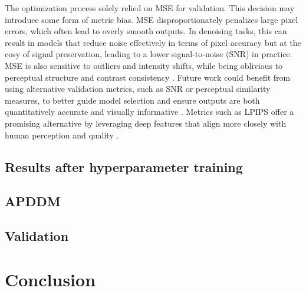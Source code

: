 \documentclass[twocolumn]{article}
\begin{document}
The optimization process solely relied on MSE for validation. This decision may introduce some form of metric bias. 
MSE disproportionately penalizes large pixel errors, which often lead to overly smooth outputs. 
In denoising tasks, this can result in models that reduce noise effectively in terms of pixel accuracy but at the cosy of signal preservation, leading to a lower signal-to-noise (SNR) in practice. 
MSE is also sensitive to outliers and intensity shifts, while being oblivious to perceptual structure and contrast consistency \cite{1284395}. 
Future work could benefit from using alternative validation metrics, such as SNR or perceptual similarity measures, to better guide model selection and ensure outputs are both quantitatively accurate and visually informative \cite{chavhan2009t2star}. 
Metrics such as LPIPS offer a promising alternative by leveraging deep features that align more closely with human perception and quality \cite{zhang2018unreasonableeffectivenessdeepfeatures}.

\subsection{Results after hyperparameter training}

\subsection{APDDM}

\subsection{Validation}

\section{Conclusion}
\end{document}
